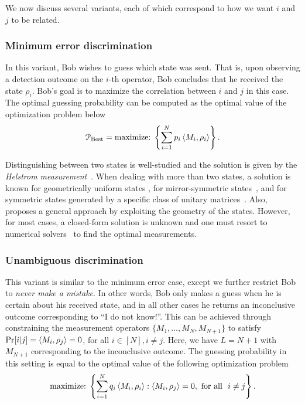 We now discuss several variants, each of which correspond to how we want $i$ and $j$ to be related. 

\subsubsection{Minimum error discrimination}
In this variant, Bob wishes to guess which state was sent. 
That is, upon observing a detection outcome on the $i$-th operator, Bob concludes that he received the state $\rho_i$.
Bob's goal is to maximize the correlation between $i$ and $j$ in this case. 
The optimal guessing probability can be computed as the optimal value of the optimization problem below 
\begin{align}
    \label{eq:ch3_QSD-ME}
    \mathcal{P}_{\mathrm{Best}} = \text{maximize:} \; \left\{ \sum_{i=1}^N p_i \left\langle M_i, \rho_i \right\rangle \right\}.
\end{align}

Distinguishing between two states is well-studied and the solution is given by the \emph{Helstrom measurement}~\cite{helstrom1969quantum}.  
When dealing with more than two states, a solution is known for geometrically uniform states \cite{eldar2004optimal}, for mirror-symmetric states~\cite{andersson2002minimum}, and for symmetric states generated by a specific class of unitary matrices~\cite{barnett2001minimum, chiribella2004covariant, chiribella2006maximum}. 
Also, \cite{bae2013structure} proposes a general approach by exploiting the geometry of the states.
However, for most cases, a closed-form solution is unknown and one must resort to numerical solvers~\cite{cvx} to find the optimal measurements.

\subsubsection{Unambiguous discrimination} 
This variant is similar to the minimum error case, except we further restrict Bob to \emph{never make a mistake}. 
In other words, Bob only makes a guess when he is certain about his received state, and in all other cases he returns an inconclusive outcome corresponding to ``I do not know!''. 
This can be achieved through constraining the measurement operators $\{M_1, \dots, M_N, M_{N+1}\}$ to satisfy $\Pr[i|j] = \left\langle M_i, \rho_j \right\rangle = 0$, for all $i \in [N], i \ne j$. 
Here, we have $L = N+1$ with $M_{N+1}$ corresponding to the inconclusive outcome.
The guessing probability in this setting is equal to the optimal value of the following optimization problem 
\begin{align}
    \label{eq:ch3_QSD-UA}
    \text{maximize:} \;  \left\{ \sum_{i=1}^N q_i \left\langle M_i, \rho_i \right\rangle  : \left\langle M_i, \rho_j \right\rangle = 0, \text{ for all }\ i \ne j \right\}.
\end{align}

